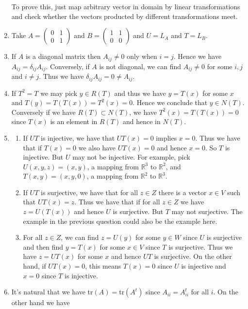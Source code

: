 \begin{enumerate}
To prove this, just map arbitrary vector in domain by linear transformations and check whether the vectors producted by different transformations meet.
\item Take $A=\left(\begin{array}{cc}0&1\\0&1\end{array}\right)$ and $B=\left(\begin{array}{cc}1&1\\0&0\end{array}\right)$ and $U=L_A$ and $T=L_B$.
\item If $A$ is a diagonal matrix then $A_{ij}\neq 0$ only when $i=j$. Hence we have $A_{ij}=\delta_{ij}A_{ij}$. Conversely, if $A$ is not diagonal, we can find $A_{ij}\neq 0$ for some $i,j$ and $i\neq j$. Thus we have $\delta_{ij}A_{ij}=0\neq A_{ij}$.
\item If $T^2=T$ we may pick $y\in R(T)$ and thus we have $y=T(x)$ for some $x$ and $T(y)=T(T(x))=T^2(x)=0$. Hence we conclude that $y\in N(T)$. Conversely if we have $R(T)\subset N(T)$, we have $T^2(x)=T(T(x))=0$ since $T(x)$ is an element in $R(T)$ and hence in $N(T)$.
\item \begin{enumerate}
\item If $UT$ is injective, we have that $UT(x)=0$ implies $x=0$. Thus we have that if $T(x)=0$ we also have $UT(x)=0$ and hence $x=0$. So $T$ is injective. But $U$ may not be injective. For example, pick $U(x,y,z)=(x,y)$, a mapping from $\mathbb{R}^3$ to $\mathbb{R}^2$, and $T(x,y)=(x,y,0)$, a mapping from $\mathbb{R}^2$ to $\mathbb{R}^3$.
\item If $UT$ is surjective, we have that for all $z\in Z$ there is a vector $x\in V$ such that $UT(x)=z$. Thus we have that if for all $z\in Z$ we have $z=U(T(x))$ and hence $U$ is surjective. But $T$ may not surjective. The example in the previous question could also be the example here.
\item For all $z\in Z$, we can find $z=U(y)$ for some $y\in W$ since $U$ is surjective and then find $y=T(x)$ for some $x\in V$ since $T$ is surjective. Thus we have $z=UT(x)$ for some $x$ and hence $UT$ is surjective. On the other hand, if $UT(x)=0$, this means $T(x)=0$ since $U$ is injective and $x=0$ since $T$ is injective.
\end{enumerate}
\item It's natural that we have tr$(A)=$tr$(A^t)$ since $A_{ii}=A^t_{ii}$ for all $i$. On the other hand we have 
\begin{align*}

\end{align*}
\end{enumerate}

